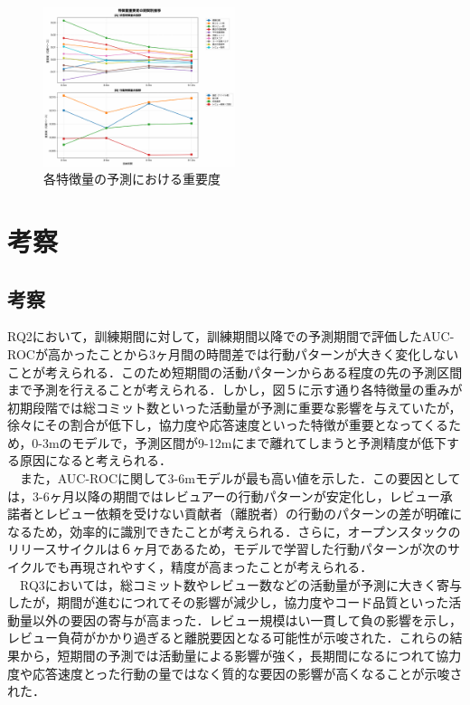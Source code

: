 \documentclass[submit,techrep,noauthor]{ipsj}
\begin{document}
\begin{figure}[h]
    \centering
\includegraphics[width=0.5\textwidth]{./Hashimoto_fig/importance.pdf}
    \caption{各特徴量の予測における重要度}
    \label{fig:importance}
\end{figure}



\section{考察}
\label{sec:discussion}
\subsection{考察}
RQ2において，訓練期間に対して，訓練期間以降での予測期間で評価したAUC-ROCが高かったことから3ヶ月間の時間差では行動パターンが大きく変化しないことが考えられる．このため短期間の活動パターンからある程度の先の予測区間まで予測を行えることが考えられる．しかし，図５に示す通り各特徴量の重みが初期段階では総コミット数といった活動量が予測に重要な影響を与えていたが，徐々にその割合が低下し，協力度や応答速度といった特徴が重要となってくるため，0-3mのモデルで，予測区間が9-12mにまで離れてしまうと予測精度が低下する原因になると考えられる．\\
　また，AUC-ROCに関して3-6mモデルが最も高い値を示した．この要因としては，3-6ヶ月以降の期間ではレビュアーの行動パターンが安定化し，レビュー承諾者とレビュー依頼を受けない貢献者（離脱者）の行動のパターンの差が明確になるため，効率的に識別できたことが考えられる．さらに，オープンスタックのリリースサイクルは６ヶ月であるため，モデルで学習した行動パターンが次のサイクルでも再現されやすく，精度が高まったことが考えられる．\\
　RQ3においては，総コミット数やレビュー数などの活動量が予測に大きく寄与したが，期間が進むにつれてその影響が減少し，協力度やコード品質といった活動量以外の要因の寄与が高まった．レビュー規模はい一貫して負の影響を示し，レビュー負荷がかかり過ぎると離脱要因となる可能性が示唆された．これらの結果から，短期間の予測では活動量による影響が強く，長期間になるにつれて協力度や応答速度とった行動の量ではなく質的な要因の影響が高くなることが示唆された．
\end{document}

